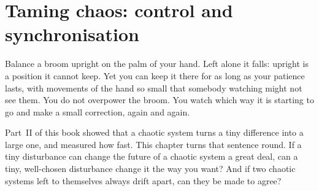 
\chapter{Taming chaos: control and synchronisation}
\label{ch:taming}

\noindent
Balance a broom upright on the palm of your hand. Left alone it falls:
upright is a position it cannot keep. Yet you can keep it there for as long
as your patience lasts, with movements of the hand so small that somebody
watching might not see them. You do not overpower the broom. You watch which
way it is starting to go and make a small correction, again and again.

Part~II of this book showed that a chaotic system turns a tiny difference
into a large one, and measured how fast. This chapter turns that sentence
round. If a tiny disturbance can change the future of a chaotic system a
great deal, can a tiny, well-chosen disturbance change it the way you want?
And if two chaotic systems left to themselves always drift apart, can they
be made to agree?

\begin{outcomes}
\end{outcomes}

